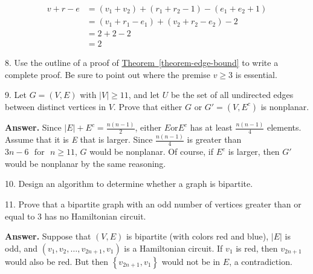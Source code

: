 \documentclass[10pt,]{book}
\theoremstyle{plain}
\theoremstyle{definition}
\theoremstyle{definition}
\theoremstyle{definition}
\theoremstyle{definition}
\theoremstyle{definition}
\numberwithin{equation}{section}
\begin{document}
\begin{exercisegroup}
\begin{equation*}
\begin{split}
v+r-e &=\left(v_1+v_2\right)+\left(r_1+r_2-1\right)-\left(e_1+e_2+1\right)\\
	&=\left(v_1+r_1-e_1\right)+\left(v_2+r_2-e_2\right)-2\\
	&=2 + 2 -2\\
	&=2
\end{split}
\end{equation*}
%
\item[8.]\hypertarget{exercise-49}{} Use the outline of a proof of \hyperref[theorem-edge-bound]{Theorem~\ref{theorem-edge-bound}} to write a complete proof. Be sure to point out where the premise \(v\geq 3\) is essential.%
\par\smallskip
\item[9.]\hypertarget{exercise-50}{} Let \(G = (V,E)\) with \(|V|\geq 11\), and let \(U\) be the set of all undirected edges between distinct vertices in \(V\).  Prove
that either \(G\) or \(G' = \left(V,E^c\right)\) is nonplanar.%
\par\smallskip
\par\smallskip
\noindent\textbf{Answer.}\hypertarget{answer-20}{}\quad
 Since \(\left| E\right| +E^c=\frac{n(n-1)}{2}\), either \(E \text{or} E^c\) has at least \(\frac{n(n-1)}{4}\) elements. Assume that it is \textit{
E} that is larger. Since \(\frac{n(n-1)}{4}\) is greater than \(3n-6\text{  }\text{for}\text{  }n\geqslant 11\), \(G\) would be nonplanar.
Of course, if \(E^c\) is larger, then \(G'\) would be nonplanar by the same reasoning.
%
\item[10.]\hypertarget{exercise-51}{} Design an algorithm to determine whether a graph is bipartite.%
\par\smallskip
\item[11.]\hypertarget{exercise-52}{} Prove that a bipartite graph with an odd number of vertices greater than or equal to 3 has no Hamiltonian circuit.%
\par\smallskip
\par\smallskip
\noindent\textbf{Answer.}\hypertarget{answer-21}{}\quad
Suppose that \((V,E)\) is bipartite (with colors red and blue), \(\left| E\right|\) is odd, and \(\left(v_1,v_2,\ldots ,v_{2n+1},v_1\right)\)
is a Hamiltonian circuit. If \(v_1\) is red, then \(v_{2n+1}\) would also be red. But then \(\left\{v_{2n+1},v_1\right\}\) would not be in \(E\), a contradiction.
%
\end{exercisegroup}
\par\smallskip\noindent
\end{document}
